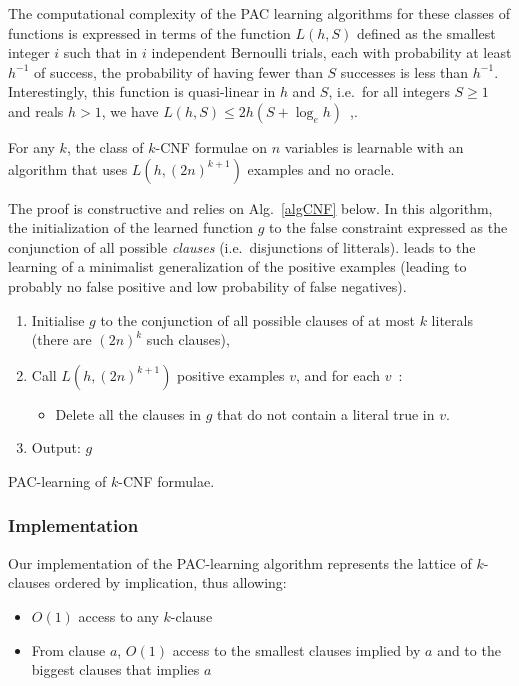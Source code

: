 \documentclass{llncs}
\begin{document}
The computational complexity of the PAC learning algorithms for these classes of functions is expressed in terms of the function
$L(h,S)$ defined as the smallest integer $i$ such that
in $i$ independent Bernoulli trials, each with probability at least $h^{-1}$ of success, the probability of having fewer than $S$ successes is less than $h^{-1}$.
Interestingly, this function is quasi-linear in $h$ and $S$, i.e.~for all
integers $S\ge 1$ and reals $h>1$, we have $L(h,S) \le 2h(S+\log_e h)$~\cite{Valiant84cacm},.

\begin{theorem}\label{thm:kcnf}
For any $k$, the class of $k$-CNF formulae on $n$ variables is learnable with an
algorithm that uses $L(h,{(2 n)}^{k+1})$ examples and no oracle.
\end{theorem}

The proof is constructive and relies on Alg.~\ref{algCNF} below. In this algorithm, the initialization of the learned function $g$ to the false constraint expressed as the conjunction of all possible \emph{clauses} (i.e.~disjunctions of litterals).
leads to the learning of a minimalist  generalization of the positive examples (leading to probably no false positive and low probability of false negatives).

\begin{algorithm}
\begin{enumerate}
  \item Initialise $g$ to the conjunction of all possible clauses of at most $k$ literals (there are $(2n)^k$ such clauses),
\item Call $L(h,(2n)^{k+1})$ positive examples $v$, and for each $v$~:
\begin{itemize}
\item Delete all the clauses in $g$ that do not contain a literal true in $v$.	
\end{itemize}
\item Output: $g$
\end{enumerate}
\caption{PAC-learning of $k$-CNF formulae.\label{algCNF}}
\end{algorithm}

\subsubsection{Implementation}
Our implementation of the PAC-learning algorithm represents the lattice of $k$-clauses ordered by implication, thus allowing:
\begin{itemize}
	\item $O(1)$ access to any $k$-clause
	\item From clause $a$, $O(1)$ access to the smallest clauses implied by $a$ and to the biggest clauses that implies $a$
\end{itemize}
\end{document}
